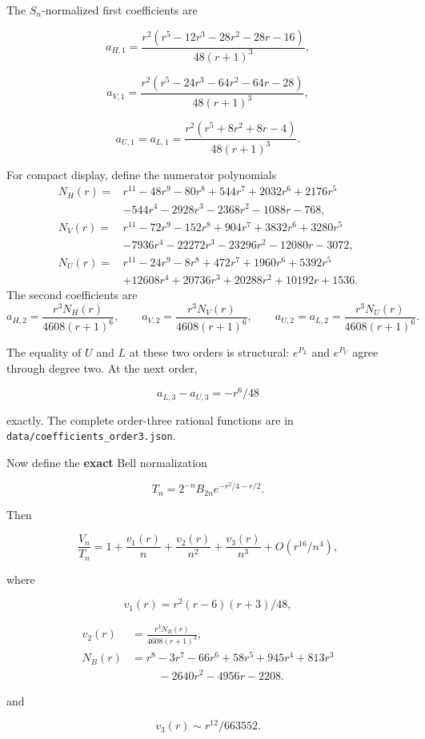 The \(S_n\)-normalized first coefficients are

\[
 a_{H,1}=\frac{r^2(r^5-12r^3-28r^2-28r-16)}{48(r+1)^3},
\]

\[
 a_{V,1}=\frac{r^2(r^5-24r^3-64r^2-64r-28)}{48(r+1)^3},
\]

\[
 a_{U,1}=a_{L,1}
 =\frac{r^2(r^5+8r^2+8r-4)}{48(r+1)^3}.
\]

For compact display, define the numerator polynomials
\begin{align*}
N_H(r)={}&r^{11}-48r^9-80r^8+544r^7+2032r^6+2176r^5\\
 &-544r^4-2928r^3-2368r^2-1088r-768,\\
N_V(r)={}&r^{11}-72r^9-152r^8+904r^7+3832r^6+3280r^5\\
 &-7936r^4-22272r^3-23296r^2-12080r-3072,\\
N_U(r)={}&r^{11}-24r^9-8r^8+472r^7+1960r^6+5392r^5\\
 &+12608r^4+20736r^3+20288r^2+10192r+1536.
\end{align*}
The second coefficients are
\[
a_{H,2}=\frac{r^3N_H(r)}{4608(r+1)^6},\qquad
a_{V,2}=\frac{r^3N_V(r)}{4608(r+1)^6},\qquad
a_{U,2}=a_{L,2}=\frac{r^3N_U(r)}{4608(r+1)^6}.
\]

The equality of \(U\) and \(L\) at these two orders is structural:
\(e^{P_L}\) and \(e^{P_U}\) agree through degree two. At the next order,

\[
 a_{L,3}-a_{U,3}=-r^6/48
 \tag{C16}\label{tcl:eq:C16}
\]

exactly. The complete order-three rational functions are in
\texttt{data/coefficients\_order3.json}.

Now define the \textbf{exact} Bell normalization

\[
 T_n=2^{-n}B_{2n}e^{-r^2/4-r/2}.
\]

Then

\[
 \frac{V_n}{T_n}=1+\frac{v_1(r)}n+\frac{v_2(r)}{n^2}
 +\frac{v_3(r)}{n^3}+O(r^{16}/n^4),
\]

where

\[
 v_1(r)=r^2(r-6)(r+3)/48,
\]

\[
\begin{split}
 v_2(r)&=\frac{r^3 N_B(r)}{4608(r+1)^3},\\
 N_B(r)&=r^8-3r^7-66r^6+58r^5+945r^4+813r^3\\
 &\hspace{1cm}-2640r^2-4956r-2208.
\end{split}
\]

and

\[
 v_3(r)\sim r^{12}/663552.
\]


